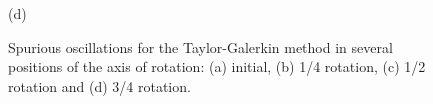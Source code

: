 \begin{figure}[H]
\begin{minipage}{.5\linewidth}
      (d)
     \end{minipage}
     \medskip
     \caption{
Spurious oscillations for the Taylor-Galerkin method in several positions of the axis of rotation:	
     (a) initial, 
     (b) 1/4 rotation,
     (c) 1/2 rotation and
     (d) 3/4 rotation.}
     \label{taylor}
\end{figure}

